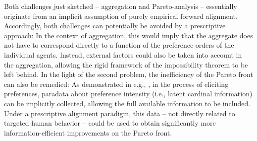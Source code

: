 \documentclass{article}
\theoremstyle{plain}
\theoremstyle{definition}
\theoremstyle{remark}
\begin{document}
Both challenges just sketched -- aggregation and Pareto-analysis -- essentially originate from an implicit assumption of purely empirical forward alignment. %
Accordingly, both challenges can potentially be avoided by a prescriptive approach: In the context of aggregation, this would imply that the aggregate does not have to correspond directly to a function of the preference orders of the individual agents. Instead, external factors could also be taken into account in the aggregation, allowing the rigid framework of the impossibility theorem to be left behind. In the light of the second problem, the inefficiency of the Pareto front can also be remedied: As demonstrated in e.g., \citet{kreuter2013improving,jbas2022}, in the process of eliciting preferences, paradata about preference intensity (i.e., latent cardinal information) can be implicitly collected, allowing the full available information to be included. Under a prescriptive alignment paradigm, this data -- not directly related to targeted human behavior -- could be used to obtain significantly more information-efficient improvements on the Pareto front.




\end{document}
